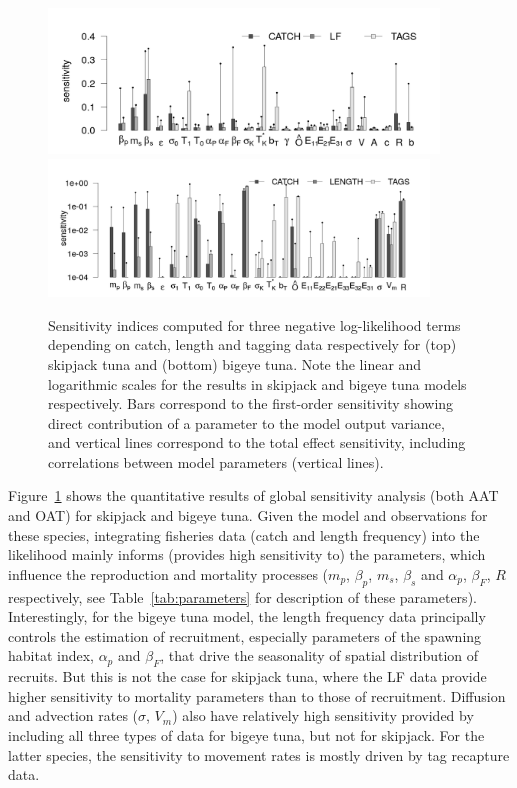 \begin{figure}[H]
\begin{center}
\includegraphics[width=0.925\textwidth]{chapter4/figs/skj-SA-SF-ST}\\
\includegraphics[width=0.9\textwidth]{chapter4/figs/bet-SA-SF-ST}\\
\caption{ Sensitivity indices computed for three negative log-likelihood terms depending on catch, length and tagging data respectively for (top) skipjack tuna\citep*[from][]{Senina20b} and (bottom) bigeye tuna\citep*[from][]{Senina2020c}. Note the linear and logarithmic scales for the results in skipjack and bigeye tuna models respectively.  Bars correspond to the first-order sensitivity showing direct contribution of a parameter to the model output variance, and vertical lines correspond to the total effect sensitivity, including correlations between model parameters (vertical lines). }
\label{SA}
\end{center}
\end{figure}

Figure~\ref{SA} shows the quantitative results of global sensitivity analysis (both AAT and OAT) for skipjack and bigeye tuna. Given the model and observations for these species, integrating fisheries data (catch and length frequency) into the likelihood mainly informs (provides high sensitivity to) the parameters, which influence the reproduction and mortality processes ($m_p$, $\beta_p$, $m_s$, $\beta_s$ and $\alpha_p$, $\beta_F$, $R$ respectively, see Table~\ref{tab:parameters} for description of these parameters). Interestingly, for the bigeye tuna model, the length frequency data principally controls the estimation of recruitment, especially parameters of the spawning habitat index, $\alpha_p$ and $\beta_F$, that drive the seasonality of spatial distribution of recruits. But this is not the case for skipjack tuna, where the LF data provide higher sensitivity to mortality parameters than to those of recruitment. Diffusion and advection rates ($\sigma$, $V_m$) also have  relatively high sensitivity provided by including all three types of data for bigeye tuna, but not for skipjack. For the latter species, the sensitivity to movement rates is mostly driven by tag recapture data. 

